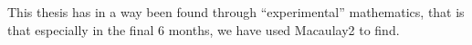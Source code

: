 \begin{preface}
\markboth{}{} %

This thesis has in a way been found through ``experimental'' mathematics, that is that especially in the final 6 months, we have used Macaulay2 to find.
\end{preface}





